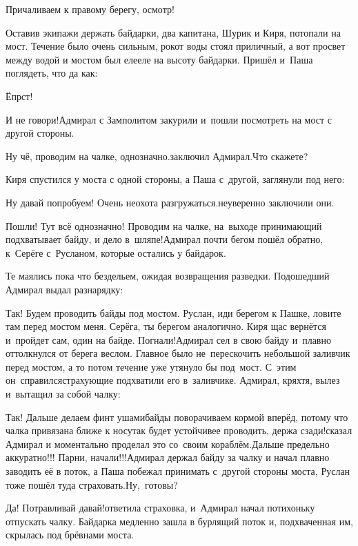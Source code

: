 \diagdash Причаливаем к правому берегу, осмотр!

Оставив экипажи держать байдарки, два капитана, Шурик и Киря, потопали на мост. Течение было очень сильным, рокот воды стоял приличный, а вот просвет между водой и мостом был еле\sdash еле на высоту байдарки. Пришёл и~Паша поглядеть, что да как:

\diagdash Ёпрст!

\diagdash И не говори!\mdash Адмирал с Замполитом закурили и~пошли посмотреть на мост с другой стороны.

\diagdash Ну чё, проводим на чалке, однозначно.\mdash заключил Адмирал.\mdash Что скажете?

Киря спустился у моста с одной стороны, а Паша с~другой, заглянули под него:

\diagdash Ну давай попробуем! Очень неохота разгружаться.\mdash неуверенно заключили они.

\diagdash Пошли! Тут всё однозначно! Проводим на чалке, на~выходе принимающий подхватывает байду, и дело в~шляпе!\mdash Адмирал почти бегом пошёл обратно, к~Серёге с~Русланом, которые остались у байдарок.

Те маялись пока что бездельем, ожидая возвращения разведки. Подошедший Адмирал выдал разнарядку:

\diagdash Так! Будем проводить байды под мостом. Руслан, иди берегом к Пашке, ловите там перед мостом меня. Серёга, ты берегом аналогично. Киря щас вернётся и~пройдет сам, один на байде. Погнали!\mdash Адмирал сел в свою байду и~плавно оттолкнулся от берега веслом. Главное было не~перескочить небольшой заливчик перед мостом, а то потом течение уже утянуло бы под~мост. С~этим он~справился\mdash страхующие подхватили его в~заливчике. Адмирал, кряхтя, вылез и~вытащил за собой чалку:

\diagdash Так! Дальше делаем финт ушами\mdash байды поворачиваем кормой вперёд, потому что чалка привязана ближе к носу\mdash так будет устойчивее проводить, держа сзади!\mdash сказал Адмирал и моментально проделал это со~своим кораблём.\mdash Дальше предельно аккуратно!!! Парни, начали!!!\mdash Адмирал держал байду за чалку и начал плавно заводить её в поток, а Паша побежал принимать с~другой стороны моста, Руслан тоже пошёл туда страховать.\mdash Ну,~готовы?

\diagdash Да! Потравливай давай!\mdash ответила страховка, и~Адмирал начал потихоньку отпускать чалку. Байдарка медленно зашла в бурлящий поток и, подхваченная им, скрылась под брёвнами моста.

